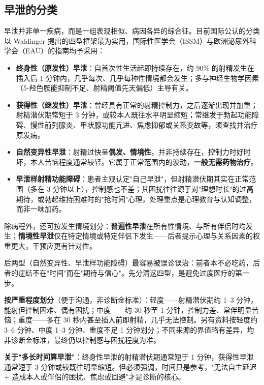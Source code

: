 \documentclass[12pt,a4paper,twoside]{ctexbook}
\begin{document}
\subsection{早泄的分类}

早泄并非单一疾病，而是一组表现相似、病因各异的综合征。目前国际公认的分类以 Waldinger 提出的四型框架最为实用，国际性医学会（ISSM）与欧洲泌尿外科学会（EAU）的指南均予采用：

\begin{itemize}
	\item \textbf{终身性（原发性）早泄}：自首次性生活起即持续存在，约 90\% 的射精发生在插入后 1 分钟内，几乎每次、几乎每种性情境都会发生；多与神经生物学因素（5-羟色胺能抑制不足、射精阈值先天偏低）主导有关。
	\item \textbf{获得性（继发性）早泄}：曾经具有正常的射精控制力，之后逐渐出现并加重；射精潜伏期常短于 3 分钟，或较本人既往水平明显缩短；常继发于勃起功能障碍、慢性前列腺炎、甲状腺功能亢进、焦虑抑郁或关系变故等，须查找并治疗原发病。
	\item \textbf{自然变异性早泄}：射精过快呈\textbf{偶发、情境性}，并非持续存在，控制力时好时坏，本人苦恼程度通常较轻。它属于正常范围内的波动，\textbf{一般无需药物治疗}。
	\item \textbf{早泄样射精功能障碍}：患者主观认定"自己早泄"，但射精潜伏期其实在正常范围（多在 3 分钟以上），控制感也不差；其困扰往往源于对"理想时长"的过高期待，或勃起维持困难时的"抢时间"心理，处理重点是心理教育与认知调整，而非一味加药。
\end{itemize}

\noindent 除病程外，还可按发生情境划分：\textbf{普遍性早泄}在所有性情境、与所有伴侣时均发生；\textbf{情境性早泄}仅在特定情境或特定伴侣下发生——后者提示心理与关系因素的权重更大，干预应更有针对性。

\begin{tcolorbox}[colback=pink!5!white,colframe=red!50!black,title=贴心小叮咛]
后两型（自然变异性、早泄样功能障碍）最容易被误诊误治：前者本不必吃药，后者的症结不在"时间"而在"期待与信心"。先分清这四型，是避免过度医疗的第一步。
\end{tcolorbox}

\noindent\textbf{按严重程度划分}（便于沟通，非诊断金标准）：轻度——射精潜伏期约 1--3 分钟，能射但控制困难、偶有困扰；中度——约 30 秒至 1 分钟，控制力差、常伴明显苦恼；重度——多在 30 秒内甚至插入前即射精，几乎无法控制。另有资料按轻度约 3--6 分钟、中度 1--3 分钟、重度不足 1 分钟划分；不同来源的界值略有差异，均非诊断金标准，最终仍以控制感与困扰程度为准。

\noindent\textbf{关于"多长时间算早泄"}：终身性早泄的射精潜伏期通常短于 1 分钟，获得性早泄通常短于 3 分钟或较既往明显缩短。但必须强调，时间只是参考，"无法自主延迟 + 造成本人或伴侣的困扰、焦虑或回避"才是诊断的核心。
\end{document}
